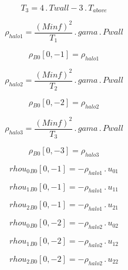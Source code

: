 \documentclass{article}
\begin{document}
\begin{dmath}T_{3} = 4 \,.\, Twall - 3 \,.\, T_{above}\end{dmath}

\begin{dmath}\rho_{halo 1} = \frac{\left(Minf \right)^{2}}{T_{1}} \,.\, gama \,.\, Pwall\end{dmath}

\begin{dmath}{\rho{_{B0}}}[{0,-1}] = \rho_{halo 1}\end{dmath}

\begin{dmath}\rho_{halo 2} = \frac{\left(Minf \right)^{2}}{T_{2}} \,.\, gama \,.\, Pwall\end{dmath}

\begin{dmath}{\rho{_{B0}}}[{0,-2}] = \rho_{halo 2}\end{dmath}

\begin{dmath}\rho_{halo 3} = \frac{\left(Minf \right)^{2}}{T_{3}} \,.\, gama \,.\, Pwall\end{dmath}

\begin{dmath}{\rho{_{B0}}}[{0,-3}] = \rho_{halo 3}\end{dmath}

\begin{dmath}{rhou_{0}{_{B0}}}[{0,-1}] = - \rho_{halo 1} \,.\, u_{01}\end{dmath}

\begin{dmath}{rhou_{1}{_{B0}}}[{0,-1}] = - \rho_{halo 1} \,.\, u_{11}\end{dmath}

\begin{dmath}{rhou_{2}{_{B0}}}[{0,-1}] = - \rho_{halo 1} \,.\, u_{21}\end{dmath}

\begin{dmath}{rhou_{0}{_{B0}}}[{0,-2}] = - \rho_{halo 2} \,.\, u_{02}\end{dmath}

\begin{dmath}{rhou_{1}{_{B0}}}[{0,-2}] = - \rho_{halo 2} \,.\, u_{12}\end{dmath}

\begin{dmath}{rhou_{2}{_{B0}}}[{0,-2}] = - \rho_{halo 2} \,.\, u_{22}\end{dmath}
\end{document}
